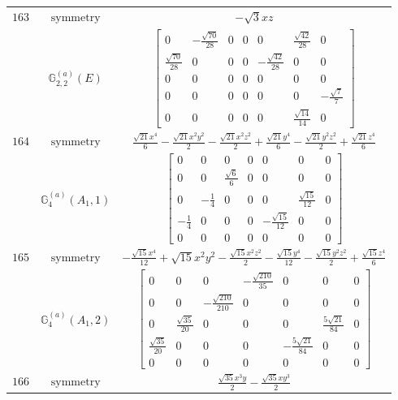 \documentclass[fleqn,8pt,landscape]{jsarticle}
\begin{document}
\begin{longtable}{ccc}
$ 163 $ & $ \text{symmetry} $ & $ - \sqrt{3} x z $ \\
$  $ & $ \mathbb{G}_{2,2}^{(a)}(E) $ & $ \begin{bmatrix} 0 & - \frac{\sqrt{70}}{28} & 0 & 0 & 0 & \frac{\sqrt{42}}{28} & 0 \\ \frac{\sqrt{70}}{28} & 0 & 0 & 0 & - \frac{\sqrt{42}}{28} & 0 & 0 \\ 0 & 0 & 0 & 0 & 0 & 0 & 0 \\ 0 & 0 & 0 & 0 & 0 & 0 & - \frac{\sqrt{7}}{7} \\ 0 & 0 & 0 & 0 & 0 & \frac{\sqrt{14}}{14} & 0 \end{bmatrix} $ \\ \hline
$ 164 $ & $ \text{symmetry} $ & $ \frac{\sqrt{21} x^{4}}{6} - \frac{\sqrt{21} x^{2} y^{2}}{2} - \frac{\sqrt{21} x^{2} z^{2}}{2} + \frac{\sqrt{21} y^{4}}{6} - \frac{\sqrt{21} y^{2} z^{2}}{2} + \frac{\sqrt{21} z^{4}}{6} $ \\
$  $ & $ \mathbb{G}_{4}^{(a)}(A_{1},1) $ & $ \begin{bmatrix} 0 & 0 & 0 & 0 & 0 & 0 & 0 \\ 0 & 0 & \frac{\sqrt{6}}{6} & 0 & 0 & 0 & 0 \\ 0 & - \frac{1}{4} & 0 & 0 & 0 & \frac{\sqrt{15}}{12} & 0 \\ - \frac{1}{4} & 0 & 0 & 0 & - \frac{\sqrt{15}}{12} & 0 & 0 \\ 0 & 0 & 0 & 0 & 0 & 0 & 0 \end{bmatrix} $ \\ \hline
$ 165 $ & $ \text{symmetry} $ & $ - \frac{\sqrt{15} x^{4}}{12} + \sqrt{15} x^{2} y^{2} - \frac{\sqrt{15} x^{2} z^{2}}{2} - \frac{\sqrt{15} y^{4}}{12} - \frac{\sqrt{15} y^{2} z^{2}}{2} + \frac{\sqrt{15} z^{4}}{6} $ \\
$  $ & $ \mathbb{G}_{4}^{(a)}(A_{1},2) $ & $ \begin{bmatrix} 0 & 0 & 0 & - \frac{\sqrt{210}}{35} & 0 & 0 & 0 \\ 0 & 0 & - \frac{\sqrt{210}}{210} & 0 & 0 & 0 & 0 \\ 0 & \frac{\sqrt{35}}{20} & 0 & 0 & 0 & \frac{5 \sqrt{21}}{84} & 0 \\ \frac{\sqrt{35}}{20} & 0 & 0 & 0 & - \frac{5 \sqrt{21}}{84} & 0 & 0 \\ 0 & 0 & 0 & 0 & 0 & 0 & 0 \end{bmatrix} $ \\ \hline
$ 166 $ & $ \text{symmetry} $ & $ \frac{\sqrt{35} x^{3} y}{2} - \frac{\sqrt{35} x y^{3}}{2} $ \\

\end{longtable}
\end{document}
